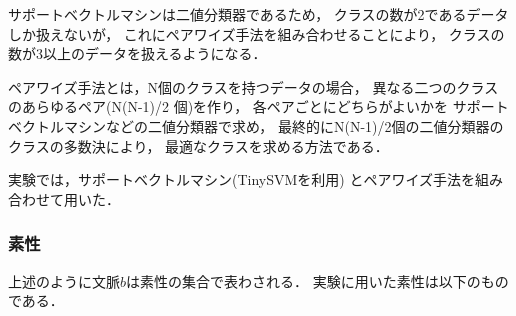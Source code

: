 サポートベクトルマシンは二値分類器であるため，
クラスの数が2であるデータしか扱えないが，
これにペアワイズ手法を組み合わせることにより，
クラスの数が3以上のデータを扱えるようになる\cite{kudoh_chunk_nl2000}．

ペアワイズ手法とは，N個のクラスを持つデータの場合，
異なる二つのクラスのあらゆるペア(N(N-1)/2 個)を作り，
各ペアごとにどちらがよいかを
サポートベクトルマシンなどの二値分類器で求め，
最終的にN(N-1)/2個の二値分類器のクラスの多数決により，
最適なクラスを求める方法である．

実験では，サポートベクトルマシン(TinySVM\cite{kudoh_svm}を利用)
とペアワイズ手法を組み合わせて用いた．

\subsubsection{素性}

上述のように文脈$b$は素性の集合で表わされる．
実験に用いた素性は以下のものである．

